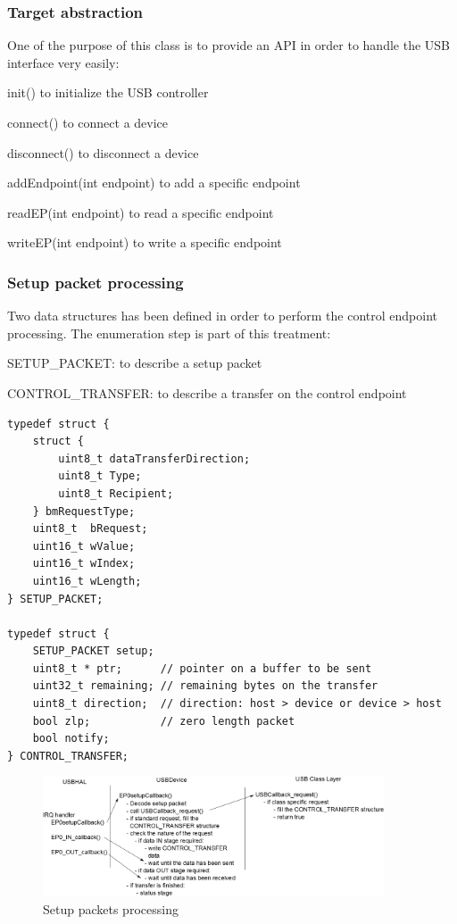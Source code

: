 \documentclass[pdftex,10pt,a4paper]{report}
\newenvironment{packed_item}{
\begin{itemize}
  \setlength{\itemsep}{1pt}
  \setlength{\parskip}{0pt}
  \setlength{\parsep}{0pt}
}{\end{itemize}}
\begin{document}
\subsubsection{Target abstraction}
One of the purpose of this class is to provide an API in order to handle the USB interface very easily:
\begin{packed_item}
	\item init() to initialize the USB controller
	\item connect() to connect a device
	\item disconnect() to disconnect a device
	\item addEndpoint(int endpoint) to add a specific endpoint
	\item readEP(int endpoint) to read a specific endpoint
	\item writeEP(int endpoint) to write a specific endpoint 
\end{packed_item}

\subsubsection{Setup packet processing}
Two data structures has been defined in order to perform the control endpoint processing. The enumeration step is part of this treatment:
\begin{packed_item}
	\item SETUP\_PACKET: to describe a setup packet
	\item CONTROL\_TRANSFER: to describe a transfer on the control endpoint
\end{packed_item}


\begin{lstlisting}[label=Data structures for control endpoint processing,caption=Data structures for control endpoint processing]
typedef struct {
    struct {
        uint8_t dataTransferDirection;
        uint8_t Type;
        uint8_t Recipient;
    } bmRequestType;
    uint8_t  bRequest;
    uint16_t wValue;
    uint16_t wIndex;
    uint16_t wLength;
} SETUP_PACKET;

typedef struct {
    SETUP_PACKET setup;
    uint8_t * ptr;      // pointer on a buffer to be sent
    uint32_t remaining; // remaining bytes on the transfer
    uint8_t direction;  // direction: host > device or device > host
    bool zlp;           // zero length packet
    bool notify;
} CONTROL_TRANSFER;
\end{lstlisting}

\begin{figure}[h!]
		\centering
		\includegraphics[width=0.9\textwidth]{./setup_packets.png}
		\caption{Setup packets processing}
		\label{Setup packets processing}
\end{figure}
\end{document}
